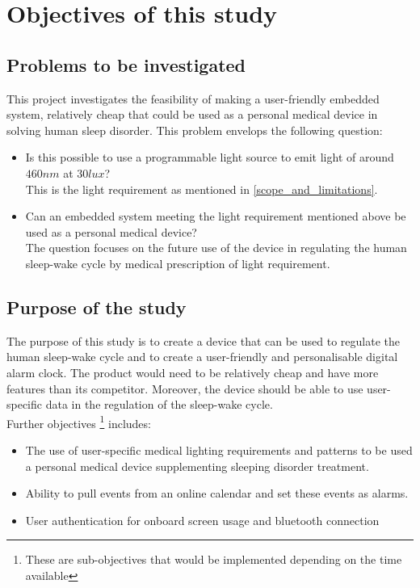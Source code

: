 \section{Objectives of this study}

\subsection{Problems to be investigated}
This project investigates the feasibility of making a user-friendly embedded system, relatively cheap that could be used as a personal medical device in solving human sleep disorder. This problem envelops the following question:
\begin{itemize}
\item[1] Is this possible to use a programmable light source to emit light of around $460nm$ at $30 lux$?\\
This is the light requirement as mentioned in \cref{scope_and_limitations}.
\item[2] Can an embedded system meeting the light requirement mentioned above be used as a personal medical device?\\
The question focuses on the future use of the device in regulating the human sleep-wake cycle by medical prescription of light requirement.
\end{itemize}

\subsection{Purpose of the study}
The purpose of this study is to create a device that can be used to regulate the human sleep-wake cycle and to create a user-friendly and personalisable digital alarm clock. The product would need to be relatively cheap and have more features than its competitor. Moreover, the device should be able to use user-specific data in the regulation of the sleep-wake cycle.\\
Further objectives \footnote{These are sub-objectives that would be implemented depending on the time available} includes:
\begin{itemize}
\item The use of user-specific medical lighting requirements and patterns to be used a personal medical device supplementing sleeping disorder treatment.
\item Ability to pull events from an online calendar and set these events as alarms.
\item User authentication for onboard screen usage and bluetooth connection  
\end{itemize} 


